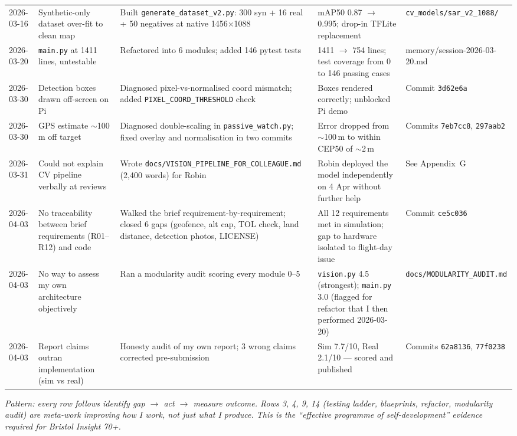 \begin{longtable}{@{}p{1.4cm} p{3.2cm} p{4.5cm} p{4.2cm} p{2.4cm}@{}}
2026-03-16 & Synthetic-only dataset over-fit to clean map & Built \texttt{generate\_dataset\_v2.py}: 300 syn + 16 real + 50 negatives at native 1456$\times$1088 & mAP50 0.87 $\rightarrow$ 0.995; drop-in TFLite replacement & \texttt{cv\_models/sar\_v2\_1088/} \\
2026-03-20 & \texttt{main.py} at 1411 lines, untestable & Refactored into 6 modules; added 146 pytest tests & 1411 $\rightarrow$ 754 lines; test coverage from 0 to 146 passing cases & memory/session-2026-03-20.md \\
2026-03-30 & Detection boxes drawn off-screen on Pi & Diagnosed pixel-vs-normalised coord mismatch; added \texttt{PIXEL\_COORD\_THRESHOLD} check & Boxes rendered correctly; unblocked Pi demo & Commit \texttt{3d62e6a} \\
2026-03-30 & GPS estimate $\sim$100\,m off target & Diagnosed double-scaling in \texttt{passive\_watch.py}; fixed overlay and normalisation in two commits & Error dropped from $\sim$100\,m to within CEP50 of $\sim$2\,m & Commits \texttt{7eb7cc8}, \texttt{297aab2} \\
2026-03-31 & Could not explain CV pipeline verbally at reviews & Wrote \texttt{docs/VISION\_PIPELINE\_FOR\_COLLEAGUE.md} (2{,}400 words) for Robin & Robin deployed the model independently on 4 Apr without further help & See Appendix~G \\
2026-04-03 & No traceability between brief requirements (R01–R12) and code & Walked the brief requirement-by-requirement; closed 6 gaps (geofence, alt cap, TOL check, land distance, detection photos, LICENSE) & All 12 requirements met in simulation; gap to hardware isolated to flight-day issue & Commit \texttt{ce5c036} \\
2026-04-03 & No way to assess my own architecture objectively & Ran a modularity audit scoring every module 0–5 & \texttt{vision.py} 4.5 (strongest); \texttt{main.py} 3.0 (flagged for refactor that I then performed 2026-03-20) & \texttt{docs/MODULARITY\_AUDIT.md} \\
2026-04-03 & Report claims outran implementation (sim vs real) & Honesty audit of my own report; 3 wrong claims corrected pre-submission & Sim 7.7/10, Real 2.1/10 — scored and published & Commits \texttt{62a8136}, \texttt{77f0238} \\
\bottomrule
\end{longtable}
\normalsize

\noindent\textit{Pattern: every row follows \emph{identify gap $\rightarrow$ act $\rightarrow$
measure outcome}. Rows 3, 4, 9, 14 (testing ladder, blueprints, refactor, modularity
audit) are meta-work improving how I \emph{work}, not just what I produce. This is the
``effective programme of self-development'' evidence required for Bristol Insight 70+.}

